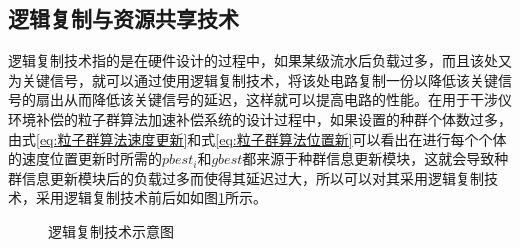   \subsection{逻辑复制与资源共享技术}
  逻辑复制技术指的是在硬件设计的过程中，如果某级流水后负载过多，而且该处又为关键信号，就可以通过使用逻辑复制技术，将该处电路复制一份以降低该关键信号的扇出从而降低该关键信号的延迟，这样就可以提高电路的性能。在用于干涉仪环境补偿的粒子群算法加速补偿系统的设计过程中，如果设置的种群个体数过多，由式\eqref{eq:粒子群算法速度更新}和式\eqref{eq:粒子群算法位置新}可以看出在进行每个个体的速度位置更新时所需的$pbest_i$和$gbest$都来源于种群信息更新模块，这就会导致种群信息更新模块后的负载过多而使得其延迟过大，所以可以对其采用逻辑复制技术，采用逻辑复制技术前后如如图\ref{fig:逻辑复制技术示意图}所示。
  \begin{figure}[htb]
    \centering
    \caption{逻辑复制技术示意图}
    \label{fig:逻辑复制技术示意图}
  \end{figure}

